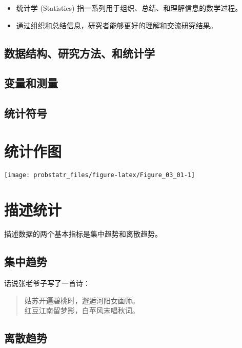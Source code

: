 \documentclass[]{ctexbook}
\begin{document}
\begin{itemize}
\item
  统计学 (Statistics) 指一系列用于组织、总结、和理解信息的数学过程。
\item
  通过组织和总结信息，研究者能够更好的理解和交流研究结果。
\end{itemize}

\section{数据结构、研究方法、和统计学}

\section{变量和测量}

\section{统计符号}

\mainmatter

\hypertarget{Plot}{%
\chapter{统计作图}\label{Plot}}

\begin{center}\texttt{[image: probstatr\_files/figure-latex/Figure\_03\_01-1]} \end{center}

\hypertarget{central-tendency}{%
\chapter{描述统计}\label{central-tendency}}

描述数据的两个基本指标是集中趋势和离散趋势。

\section{集中趋势}

话说张老爷子写了一首诗：

\begin{quote}
姑苏开遍碧桃时，邂逅河阳女画师。\\
红豆江南留梦影，白苹风末唱秋词。
\end{quote}

\section{离散趋势}
\end{document}
